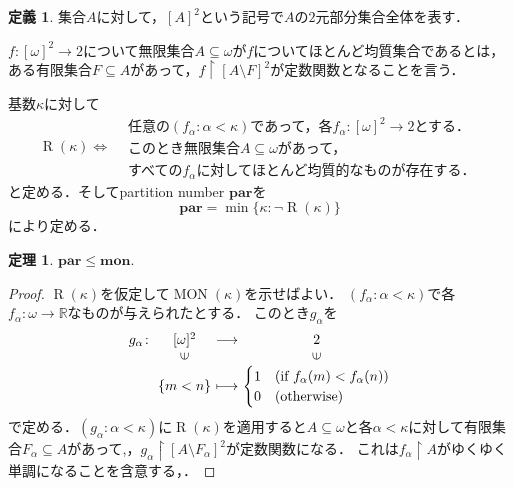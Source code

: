 \documentclass[uplatex,dvipdfmx]{jsarticle}
\newcommand{\R}{\mathbb{R}}
\renewcommand\subset{\subseteq}
\newcommand{\MON}{\operatorname{MON}}
\theoremstyle{definition}
\newtheorem*{thm*}{定理}
\newtheorem*{defi*}{定義}
\theoremstyle{named}
\begin{document}
\begin{framed}
\begin{defi*}
集合$A$に対して，$[A]^2$という記号で$A$の$2$元部分集合全体を表す．

$f: [\omega]^2 \to 2$について無限集合$A \subset \omega$が$f$についてほとんど均質集合であるとは，ある有限集合$F \subset A$があって，$f \upharpoonright [A \setminus F]^2$が定数関数となることを言う．

基数$\kappa$に対して
\[
\operatorname{R}(\kappa) \iff \begin{aligned}
&\text{任意の$(f_\alpha : \alpha < \kappa)$であって，各$f_\alpha: [\omega]^2 \to 2$とする．} \\
&\text{このとき無限集合$A \subset \omega$があって，} \\
&\text{すべての$f_\alpha$に対してほとんど均質的なものが存在する．}
\end{aligned}
\]
と定める．そしてpartition number $\mathbf{par}$を
\[
\mathbf{par} = \min \{ \kappa : \neg \operatorname{R}(\kappa) \}
\]
により定める．
\end{defi*}
\end{framed}

\begin{framed}
\begin{thm*}
$\mathbf{par} \le \mathbf{mon}$.
\end{thm*}
\end{framed}
\begin{proof}
$\operatorname{R}(\kappa)$を仮定して$\MON(\kappa)$を示せばよい．
$(f_\alpha : \alpha < \kappa)$で各$f_\alpha : \omega \to \R$なものが与えられたとする．
このとき$g_\alpha$を
\[
\begin{array}{r@{\,\,}c@{\,\,}c@{\,\,}c}
g_\alpha\colon&[\omega]^2&\longrightarrow&2\\
&\rotatebox{90}{$\in$}&&\rotatebox{90}{$\in$}\\
&\{m < n\}&\longmapsto&\begin{cases} 1 & (\text{if $f_\alpha(m) < f_\alpha(n)$}) \\ 0 & (\text{otherwise}) \end{cases}
\end{array}
\]
で定める．$(g_\alpha : \alpha < \kappa)$に$\operatorname{R}(\kappa)$を適用すると$A \subset \omega$と各$\alpha < \kappa$に対して有限集合$F_\alpha \subset A$があって,，$g_\alpha \upharpoonright [A\setminus F_\alpha]^2$が定数関数になる．
これは$f_\alpha \upharpoonright A$がゆくゆく単調になることを含意する，．
\end{proof}
\end{document}
